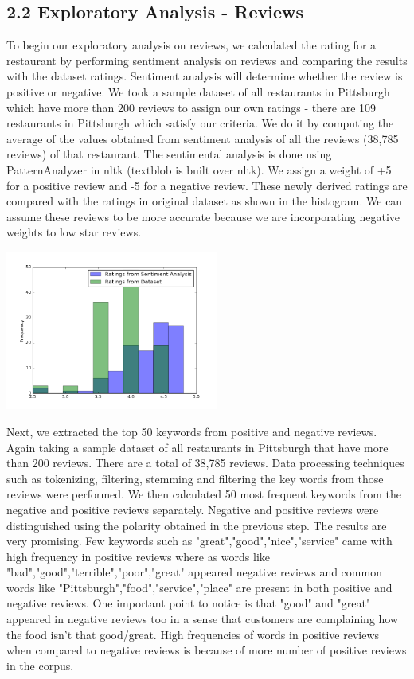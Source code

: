 \documentclass{neu_handout}
\begin{document}
\subsection*{2.2 Exploratory Analysis - Reviews}

To begin our exploratory analysis on reviews, we calculated the rating for a restaurant by performing sentiment analysis on reviews and comparing the results with the dataset ratings. Sentiment analysis will determine whether the review is positive or negative. We took a sample dataset of all restaurants in Pittsburgh which have more than 200 reviews to assign our own ratings - there are 109 restaurants in Pittsburgh which satisfy our criteria. We do it by computing the average of the values obtained from sentiment analysis of all the reviews (38,785 reviews) of that restaurant. The sentimental analysis is done using PatternAnalyzer in nltk (textblob is built over nltk). We assign a weight of +5 for a positive review and -5 for a negative review. These newly derived ratings are compared with the ratings in original dataset as shown in the histogram. We can assume these reviews to be more accurate because we are incorporating negative weights to low star reviews.

\begin{center}
\includegraphics[width=70mm,scale=0.5]{sentimentanalysis}
\end{center}

Next, we extracted the top 50 keywords from positive and negative reviews. Again taking a sample dataset of all restaurants in Pittsburgh that have more than 200 reviews. There are a total of 38,785 reviews. Data processing techniques such as tokenizing, filtering, stemming and filtering the key words from those reviews were performed. We then calculated 50 most frequent keywords from the negative and positive reviews separately. Negative and positive reviews were distinguished using the polarity obtained in the previous step.
The results are very promising. Few keywords such as "great","good","nice","service" came with high frequency in positive reviews where as words like "bad","good","terrible","poor","great" appeared negative reviews and common words like "Pittsburgh","food","service","place" are present in both positive and negative reviews. One important point to notice is that "good" and "great" appeared in negative reviews too in a sense that customers are complaining how the food isn't that good/great. High frequencies of words in positive reviews when compared to negative reviews is because of more number of positive reviews in the corpus.
\end{document}
